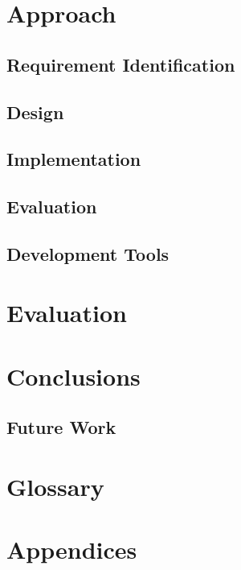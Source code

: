 \documentclass{article}
\begin{document}
\chapter{Approach}
\section{Requirement Identification}
\section{Design}
\section{Implementation}
\section{Evaluation}
\section{Development Tools}

\chapter{Evaluation}


\chapter{Conclusions}
\section{Future Work}

\chapter{Glossary}



\chapter{Appendices}
\end{document}
